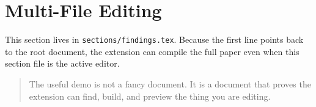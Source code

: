 
\section{Multi-File Editing}

This section lives in \texttt{sections/findings.tex}. Because the first line
points back to the root document, the extension can compile the full paper even
when this section file is the active editor.

\begin{quote}
The useful demo is not a fancy document. It is a document that proves the
extension can find, build, and preview the thing you are editing.
\end{quote}
